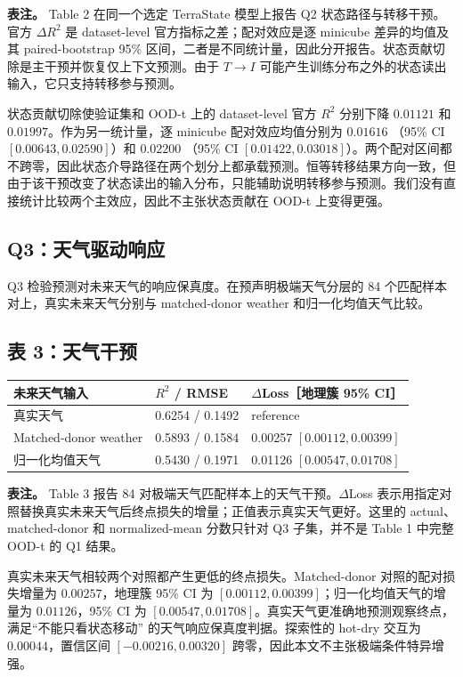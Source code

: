 \documentclass[11pt,a4paper,fontset=fandol]{ctexart}
\begin{document}
\textbf{表注。} Table 2 在同一个选定 TerraState 模型上报告 Q2 状态路径与转移干预。官方 $\Delta R^2$ 是 dataset-level 官方指标之差；配对效应是逐 minicube 差异的均值及其 paired-bootstrap 95\% 区间，二者是不同统计量，因此分开报告。状态贡献切除是主干预并恢复仅上下文预测。由于 $T\rightarrow I$ 可能产生训练分布之外的状态读出输入，它只支持转移参与预测。

状态贡献切除使验证集和 OOD-t 上的 dataset-level 官方 $R^2$ 分别下降 $0.01121$ 和 $0.01997$。作为另一统计量，逐 minicube 配对效应均值分别为 $0.01616$ （95\% CI $[0.00643,0.02590]$）和 $0.02200$ （95\% CI $[0.01422,0.03018]$）。两个配对区间都不跨零，因此状态介导路径在两个划分上都承载预测。恒等转移结果方向一致，但由于该干预改变了状态读出的输入分布，只能辅助说明转移参与预测。我们没有直接统计比较两个主效应，因此不主张状态贡献在 OOD-t 上变得更强。

\subsection{Q3：天气驱动响应}

Q3 检验预测对未来天气的响应保真度。在预声明极端天气分层的 84 个匹配样本对上，真实未来天气分别与 matched-donor weather 和归一化均值天气比较。

\subsection*{表 3：天气干预}

\begin{center}
\small
\begin{tabularx}{\textwidth}{@{}Y Y Y@{}}
\toprule
\textbf{未来天气输入} & \textbf{$R^2$ / RMSE} & \textbf{$\Delta$Loss［地理簇 95\% CI］} \\
\midrule
真实天气 & 0.6254 / 0.1492 & reference \\
Matched-donor weather & 0.5893 / 0.1584 & 0.00257 $[0.00112,0.00399]$ \\
归一化均值天气 & 0.5430 / 0.1971 & 0.01126 $[0.00547,0.01708]$ \\
\bottomrule
\end{tabularx}
\end{center}

\textbf{表注。} Table 3 报告 84 对极端天气匹配样本上的天气干预。$\Delta$Loss 表示用指定对照替换真实未来天气后终点损失的增量；正值表示真实天气更好。这里的 actual、matched-donor 和 normalized-mean 分数只针对 Q3 子集，并不是 Table 1 中完整 OOD-t 的 Q1 结果。

真实未来天气相较两个对照都产生更低的终点损失。Matched-donor 对照的配对损失增量为 $0.00257$，地理簇 95\% CI 为 $[0.00112,0.00399]$；归一化均值天气的增量为 $0.01126$，95\% CI 为 $[0.00547,0.01708]$。真实天气更准确地预测观察终点，满足“不能只看状态移动” 的天气响应保真度判据。探索性的 hot-dry 交互为 $0.00044$，置信区间 $[-0.00216,0.00320]$ 跨零，因此本文不主张极端条件特异增强。
\end{document}
